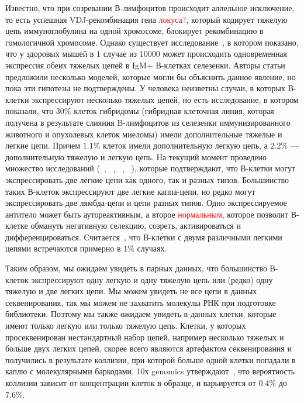 \documentclass{spbau-diploma}
\newcommand{\todo}{\textcolor{red}}
\begin{document}
Известно, что при созревании В-лимфоцитов происходит аллельное исключение, то есть успешная VDJ-рекомбинация гена \todo{локуса?}, который кодирует тяжелую цепь иммуноглобулина на одной хромосоме, блокирует  рекомбинацию в гомологичной хромосоме.
Однако существует исследование~\cite{barreto2000frequency}, в котором показано, что у здоровых мышей в $1$ случае из $10000$ может происходить одновременная экспрессия обеих тяжелых цепей в IgM+ В-клетках селезенки.
Авторы статьи предложили несколько моделей, которые могли бы объяснить данное явление, но пока эти гипотезы не подтверждены.
У человека неизветны случаи, в которых В-клетки экспрессируют несколько тяжелых цепей, но есть исследование, в котором показали, что $30\%$ клеток гибридомы (гибридная клеточная линия, которая получена в результате слияния B-лимфоцитов из селезенки иммунизированного животного и опухолевых клеток миеломы) имели дополнительные тяжелые и легкие цепи.
Причем  $1.1\%$ клеток имели дополнительную легкую цепь, а $2.2\%$ --- дополнительную тяжелую и легкую цепь.
На текущий момент проведено множество исследований (~\cite{pelanda2014dual}, ~\cite{casellas2007igkappa}, ~\cite{liu2005receptor}, ~\cite{fraser2015immunoglobulin}), которые подтверждают, что В-клетки могут экспрессировать две легкие цепи как одного, так и разных типов.
Большинство таких В-клеток экспрессируют две легкие каппа-цепи, но редко могут экспрессировать две лямбда-цепи и цепи разных типов.
Одно экспрессируемое антитело может быть аутореактивным, а второе \todo{нормальным}, которое позволит В-клетке обмануть негативную селекцию, созреть, активироваться и дифференцироваться.
Считается~\cite{dekosky2015depth}, что В-клетки  с двумя различными легкими цепями встречаются примерно в $1\%$ случаях.


Таким образом, мы ожидаем увидеть в парных данных, что большинство В-клеток экспрессируют одну легкую и одну тяжелую цепь или (редко) одну тяжелую и две легких цепи.
Мы можем увидеть не все цепи в данных секвенирования, так мы можем не захватить молекулы РНК при подготовке библиотеки.
Поэтому мы также ожидаем увидеть в данных клетки, которые имеют только легкую или только тяжелую цепь.
Клетки, у которых просеквенирован нестандартный набор цепей, например несколько тяжелых и больше двух легких цепей, скорее всего являются артефактом секвенирования и получились в результате коллизии, при которой больше одной клетки попадали в каплю с молекулярными баркодами.
10х genomics утверждают~\cite{10x_manual}, что вероятность коллизии зависит от концентрации клеток в образце, и варьируется от $0.4\%$ до $7.6\%$.
\end{document}
